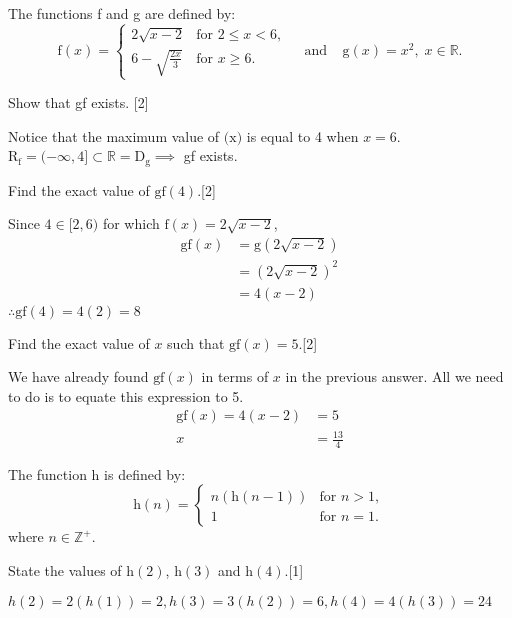 \documentclass[12pt, a4 paper]{article}
\begin{document}
\begin{outline}[enumerate]
	\1 The functions f and g are defined by: \[\textrm{f}(x)=
	\begin{cases}        
		2\sqrt{x-2}           & \textrm{for }2\leq x<6, \\
		6-\sqrt{\frac{2x}{3}} & \textrm{for }x\geq6.    
	\end{cases}   
	\;\;\;\;\textrm{and}\;\;\;\; \textrm{g}(x)=x^2,\;x\in \mathbb{R}.\]
			
	\2 Show that gf exists. \hfill[2]
	\begin{answer}
		Notice that the maximum value of $\textrm{(x)}$ is equal to 4 when $x=6$.\\
		R$_\textrm{f} = (-\infty,4] \subset \mathbb{R} = \textrm{D}_{\textrm{g}}\implies$ gf exists.		    
	\end{answer}
	\2 Find the exact value of $\textrm{gf}(4)$.\hfill[2]
	\begin{answer}
		Since $4\in [2,6)$ for which $\textrm{f}(x)=2\sqrt{x-2}$,
			\begin{align*}
				\textrm{gf}(x) & = \textrm{g}(2\sqrt{x-2}) \\
				               & = (2\sqrt{x-2})^2         \\
				               & = 4(x-2)                  
			\end{align*}
			$\therefore \textrm{gf}(4)=4(2)=8$
			\end{answer}
			\2 Find the exact value of $x$ such that $\textrm{gf}(x)=5$.\hfill[2]
			\begin{answer}
				We have already found $\textrm{gf}(x)$ in terms of $x$ in the previous answer. All we need to do is to equate this expression to 5.
				\begin{align*}
					\textrm{gf}(x) = 4(x-2) & = 5           \\
					x                       & =\frac{13}{4} 
				\end{align*}
			\end{answer}
			\1 The function h is defined by: \[\textrm{h}(n)=
			\begin{cases}        
				n(\textrm{h}(n-1)) & \textrm{for }n>1, \\
				1                  & \textrm{for }n=1. 
			\end{cases}\]
			where $n \in \mathbb{Z}^+$.
			        
			\2 State the values of $\textrm{h}(2)$, $\textrm{h}(3)$ and $\textrm{h}(4)$.\hfill[1]
			\begin{answer}
				$h(2)=2(h(1))=2, h(3)=3(h(2))=6, h(4)=4(h(3))=24$
			\end{answer}
			      

\end{outline}
\end{document}
